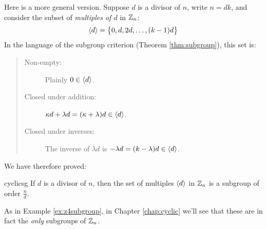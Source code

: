 Here is a more general version. Suppose $d$ is a divisor of $n$, write $n=dk$, and consider the subset of \emph{multiples of $d$} in $\mathbb{Z}_n$:
\[
	\left\langle d\right\rangle=\bigl\{0,d,2d,\ldots,(k-1)d\bigr\}
\]
In the language of the subgroup criterion (Theorem \ref{thm:subgroup}), this set is:
\begin{quote}
	\begin{description}
		\item[Non-empty:] Plainly $0\in\left\langle d\right\rangle$.
		\item[Closed under addition:] $\kappa d+\lambda d=(\kappa+\lambda)d\in\left\langle d\right\rangle$.
		\item[Closed under inverses:] The inverse of $\lambda d$ is $-\lambda d=(k-\lambda)d\in\left\langle d\right\rangle$.
	\end{description}
\end{quote}

We have therefore proved:

\begin{lemm}{}{cyclicsg}
	If $d$ is a divisor of $n$, then the set of multiples $\left\langle d\right\rangle$ in $\mathbb{Z}_n$ is a subgroup of order $\frac nd$.
\end{lemm}

As in Example \ref{ex:z4subgroup}, in Chapter \ref{chap:cyclic} we'll see that these are in fact the \emph{only} subgroups of $\mathbb{Z}_n$.


\clearpage


